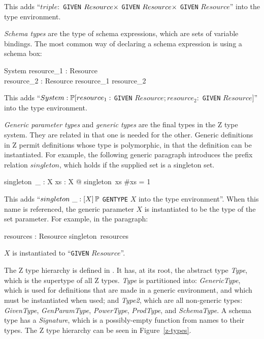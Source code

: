 This adds ``$triple : $ {\tt GIVEN}
$Resource \cross$ {\tt GIVEN} $Resource \cross$ {\tt GIVEN} $Resource$''
into the type environment.

{\em Schema types} are the type of schema expressions, which are sets
of variable bindings. The most common way of declaring a schema
expression is using a schema box:
\begin{schema}{System}
  resource_1 : Resource\\
  resource_2 : Resource
\where
  resource_1 \neq resource_2
\end{schema}

This adds ``$System
: \power [resource_1 : $ {\tt GIVEN} $Resource; resource_2 : $ {\tt GIVEN}
$Resource]$'' into the type environment.

{\em Generic parameter types} and {\em generic types} are the final
types in the Z type system. They are related in that one is needed for
the other. Generic definitions in Z permit definitions whose type is
polymorphic, in that the definition can be instantiated. For example,
the following generic paragraph introduces the prefix relation
$singleton$, which holds if the supplied set is a singleton set.
\begin{gendef}[X]
  singleton~\_ : \power X
\where
  \forall xs : \power X @ singleton~xs \iff \#xs = 1
\end{gendef}
%
%


This adds ``$singleton~\_ : [X] \power $ {\tt GENTYPE} $X$ into the
type environment''. When this name is referenced, the generic
parameter $X$ is instantiated to be the type of the set parameter. For
example, in the paragraph:
\begin{axdef}
  resources : \power Resource
\where
  singleton~resources
\end{axdef}

$X$ is instantiated to ``{\tt GIVEN} $Resource$''.

The Z type hierarchy is defined in . It has, at its root,
the abstract type {\em Type}, which is the supertype of all Z
types. {\em Type} is partitioned into: {\em GenericType}, which is
used for definitions that are made in a generic environment, and which
must be instantiated when used; and {\em Type2}, which are all
non-generic types: {\em GivenType}, {\em GenParamType}, {\em
PowerType}, {\em ProdType}, and {\em SchemaType}. A schema type has a
{\em Signature}, which is a possibly-empty function from names to
their types. The Z type hierarchy can be seen in Figure~\ref{z-types}.

